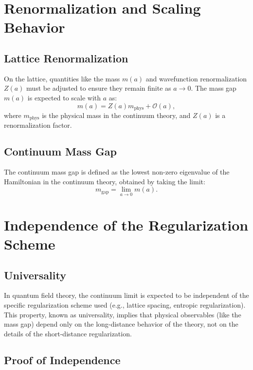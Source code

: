 \section{Renormalization and Scaling Behavior}

\subsection{Lattice Renormalization}

On the lattice, quantities like the mass \(m(a)\) and wavefunction renormalization \(Z(a)\) must be adjusted to ensure they remain finite as \(a \to 0\). The mass gap \(m(a)\) is expected to scale with \(a\) as:
\begin{equation}
m(a) = Z(a) m_{\text{phys}} + \mathcal{O}(a),
\end{equation}
where \(m_{\text{phys}}\) is the physical mass in the continuum theory, and \(Z(a)\) is a renormalization factor.

\subsection{Continuum Mass Gap}

The continuum mass gap is defined as the lowest non-zero eigenvalue of the Hamiltonian in the continuum theory, obtained by taking the limit:
\begin{equation}
m_{\text{gap}} = \lim_{a \to 0} m(a).
\end{equation}



\section{Independence of the Regularization Scheme}

\subsection{Universality}

In quantum field theory, the continuum limit is expected to be independent of the specific regularization scheme used (e.g., lattice spacing, entropic regularization). This property, known as universality, implies that physical observables (like the mass gap) depend only on the long-distance behavior of the theory, not on the details of the short-distance regularization.

\subsection{Proof of Independence}

